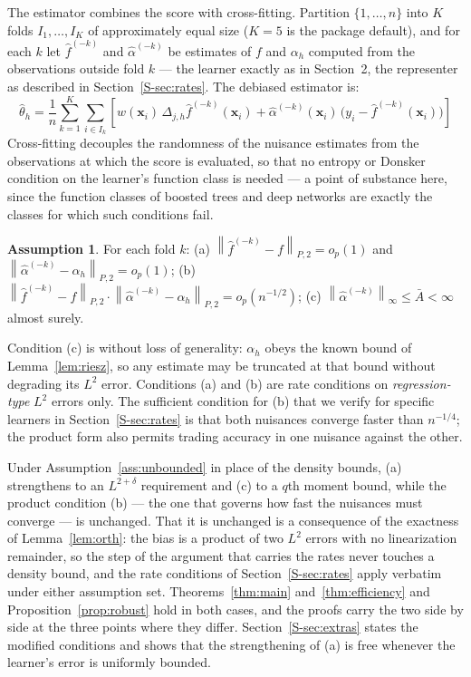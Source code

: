 \documentclass[12pt,a4paper]{article}
\numberwithin{equation}{section}
\theoremstyle{plain}
\theoremstyle{definition}
\newtheorem{assumption}{Assumption}
\newcommand{\norm}[1]{\left\| #1 \right\|}
\newcommand{\Dh}{\Delta_{j,h}}
\newcommand{\Ptwo}[1]{\norm{#1}_{P,2}}
\begin{document}
	The estimator combines the score with cross-fitting. Partition
	$\{1, \dots, n\}$ into $K$ folds $I_1, \dots, I_K$ of approximately equal size
	($K = 5$ is the package default), and for each $k$ let
	$\hat{f}^{(-k)}$ and $\hat{\alpha}^{(-k)}$ be estimates of $f$ and $\alpha_h$
	computed from the observations outside fold $k$ --- the learner exactly as in
	Section~2, the representer as described in
	Section~\ref{S-sec:rates}. The debiased estimator is:
	\begin{equation}
		\hat{\theta}_h = \frac{1}{n} \sum_{k=1}^{K} \sum_{i \in I_k}
		\left[ w(\mathbf{x}_i)\, \Dh \hat{f}^{(-k)}(\mathbf{x}_i)
		+ \hat{\alpha}^{(-k)}(\mathbf{x}_i)\,
		\bigl(y_i - \hat{f}^{(-k)}(\mathbf{x}_i)\bigr) \right]
		\label{eq:dml}
	\end{equation}
	Cross-fitting decouples the randomness of the nuisance estimates from the
	observations at which the score is evaluated, so that no entropy or Donsker
	condition on the learner's function class is needed \citep{chernozhukov2018dml} ---
	a point of substance here, since the function classes of boosted trees and deep
	networks are exactly the classes for which such conditions fail.
	
	\begin{assumption}
		\label{ass:nuisance}
		For each fold $k$: (a)
		$\Ptwo{\hat{f}^{(-k)} - f} = o_p(1)$ and
		$\Ptwo{\hat{\alpha}^{(-k)} - \alpha_h} = o_p(1)$; (b)
		$\Ptwo{\hat{f}^{(-k)} - f} \cdot \Ptwo{\hat{\alpha}^{(-k)} - \alpha_h}
		= o_p(n^{-1/2})$; (c)
		$\norm{\hat{\alpha}^{(-k)}}_\infty \leq \bar{A} < \infty$ almost surely.
	\end{assumption}
	
	Condition (c) is without loss of generality: $\alpha_h$ obeys the known bound of
	Lemma~\ref{lem:riesz}, so any estimate may be truncated at that bound without
	degrading its $L^2$ error. Conditions (a) and (b) are rate conditions on
	\emph{regression-type} $L^2$ errors only. The sufficient condition for (b) that we
	verify for specific learners in Section~\ref{S-sec:rates} is that both nuisances
	converge faster than $n^{-1/4}$; the product form also permits trading accuracy in
	one nuisance against the other.

	Under Assumption~\ref{ass:unbounded} in place of the density bounds, (a)
	strengthens to an $L^{2+\delta}$ requirement and (c) to a $q$th moment bound,
	while the product condition (b) --- the one that governs how fast the
	nuisances must converge --- is unchanged. That it is unchanged is a
	consequence of the exactness of Lemma~\ref{lem:orth}: the bias is a product
	of two $L^2$ errors with no linearization remainder, so the step of the
	argument that carries the rates never touches a density bound, and the rate
	conditions of Section~\ref{S-sec:rates} apply verbatim under either
	assumption set. Theorems~\ref{thm:main} and~\ref{thm:efficiency} and
	Proposition~\ref{prop:robust} hold in both cases, and the proofs carry the
	two side by side at the three points where they differ.
	Section~\ref{S-sec:extras} states the modified conditions and shows that the
	strengthening of (a) is free whenever the learner's error is uniformly
	bounded.
\end{document}
